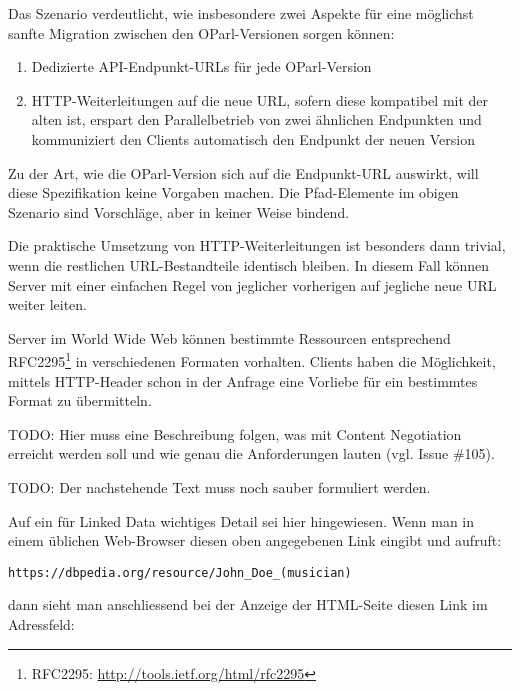 \documentclass[,a4paper]{article}
\begin{document}
Das Szenario verdeutlicht, wie insbesondere zwei Aspekte für eine
möglichst sanfte Migration zwischen den OParl-Versionen sorgen können:

\begin{enumerate}
\def\labelenumi{\arabic{enumi}.}
\item
  Dedizierte API-Endpunkt-URLs für jede OParl-Version
\item
  HTTP-Weiterleitungen auf die neue URL, sofern diese kompatibel mit der
  alten ist, erspart den Parallelbetrieb von zwei ähnlichen Endpunkten
  und kommuniziert den Clients automatisch den Endpunkt der neuen
  Version
\end{enumerate}

Zu der Art, wie die OParl-Version sich auf die Endpunkt-URL auswirkt,
will diese Spezifikation keine Vorgaben machen. Die Pfad-Elemente im
obigen Szenario sind Vorschläge, aber in keiner Weise bindend.

Die praktische Umsetzung von HTTP-Weiterleitungen ist besonders dann
trivial, wenn die restlichen URL-Bestandteile identisch bleiben. In
diesem Fall können Server mit einer einfachen Regel von jeglicher
vorherigen auf jegliche neue URL weiter leiten.


Server im World Wide Web können bestimmte Ressourcen entsprechend
RFC2295\footnote{RFC2295: \url{http://tools.ietf.org/html/rfc2295}} in
verschiedenen Formaten vorhalten. Clients haben die Möglichkeit, mittels
HTTP-Header schon in der Anfrage eine Vorliebe für ein bestimmtes Format
zu übermitteln.

TODO: Hier muss eine Beschreibung folgen, was mit Content Negotiation
erreicht werden soll und wie genau die Anforderungen lauten (vgl. Issue
\#105).

TODO: Der nachstehende Text muss noch sauber formuliert werden.

Auf ein für Linked Data wichtiges Detail sei hier hingewiesen. Wenn man
in einem üblichen Web-Browser diesen oben angegebenen Link eingibt und
aufruft:

\begin{verbatim}
https://dbpedia.org/resource/John_Doe_(musician)
\end{verbatim}

dann sieht man anschliessend bei der Anzeige der HTML-Seite diesen Link
im Adressfeld:
\end{document}
